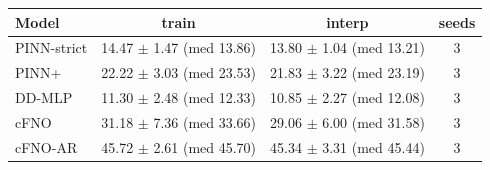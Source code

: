 \begin{tabular}{lccc}
\toprule
Model & train & interp & seeds \\
\midrule
PINN-strict & 14.47 $\pm$ 1.47 (med 13.86) & 13.80 $\pm$ 1.04 (med 13.21) & 3 \\
PINN+ & 22.22 $\pm$ 3.03 (med 23.53) & 21.83 $\pm$ 3.22 (med 23.19) & 3 \\
DD-MLP & 11.30 $\pm$ 2.48 (med 12.33) & 10.85 $\pm$ 2.27 (med 12.08) & 3 \\
cFNO & 31.18 $\pm$ 7.36 (med 33.66) & 29.06 $\pm$ 6.00 (med 31.58) & 3 \\
cFNO-AR & 45.72 $\pm$ 2.61 (med 45.70) & 45.34 $\pm$ 3.31 (med 45.44) & 3 \\
\bottomrule
\end{tabular}
